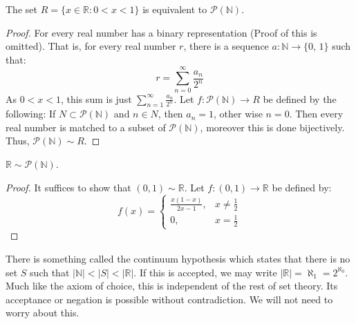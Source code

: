         \begin{theorem}
            The set $R=\{x\in \mathbb{R}:0<x<1\}$ is equivalent to
            $\mathcal{P}(\mathbb{N})$.
        \end{theorem}
        \begin{proof}
            For every real number has a binary representation (Proof of this
            is omitted). That is, for every real number $r$, there is a sequence
            $a:\mathbb{N}\rightarrow\{0,\,1\}$ such that:
            \begin{equation}
                r=\sum_{n=0}^{\infty}\frac{a_{n}}{2^{n}}
            \end{equation}
        As $0<x<1$, this sum is just $\sum_{n=1}^{\infty} \frac{a_n}{2^n}$.
        Let $f:\mathcal{P}(\mathbb{N})\rightarrow R$ be defined by the
        following: If $N\subset \mathcal{P}(\mathbb{N})$ and $n\in N$, then
        $a_{n}=1$, other wise $n=0$. Then every real number is matched to a
        subset of $\mathcal{P}(\mathbb{N})$, moreover this is done bijectively.
        Thus, $\mathcal{P}(\mathbb{N})\sim R$.
        \end{proof}
        \begin{theorem}
            $\mathbb{R}\sim\mathcal{P}(\mathbb{N})$.
        \end{theorem}
        \begin{proof}
            It suffices to show that $(0,1)\sim\mathbb{R}$.
            Let $f:(0,1)\rightarrow\mathbb{R}$ be defined by:
            \begin{equation}
                f(x)=
                \begin{cases}
                    \frac{x(1-x)}{2x-1},&x\ne\frac{1}{2}\\
                    0,&x=\frac{1}{2}
                \end{cases}
            \end{equation}
        \end{proof}
        \begin{remark}
        There is something called the continuum hypothesis which states that there is no set $S$ such
        that $|\mathbb{N}| < |S| < |\mathbb{R}|$. If this is accepted, we may write
        $|\mathbb{R}| = \aleph_1 = 2^{\aleph_0}$. Much like the axiom of choice, this is independent
        of the rest of set theory. Its acceptance or negation is possible without contradiction.
        We will not need to worry about this.
        \end{remark}